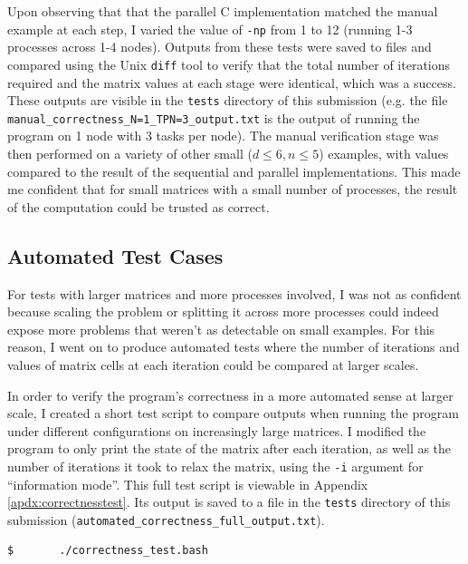 \documentclass[11pt]{article}
\begin{document}
Upon observing that that the parallel C implementation matched the manual example at each step, I varied the value of \texttt{-np} from 1 to 12 (running 1-3 processes across 1-4 nodes). Outputs from these tests were saved to files and compared using the Unix \texttt{diff} tool to verify that the total number of iterations required and the matrix values at each stage were identical, which was a success. These outputs are visible in the \texttt{tests} directory of this submission (e.g. the file \texttt{manual\_correctness\_N=1\_TPN=3\_output.txt} is the output of running the program on 1 node with 3 tasks per node). The manual verification stage was then performed on a variety of other small ($d\leq 6, n\leq 5$) examples, with values compared to the result of the sequential and parallel implementations. This made me confident that for small matrices with a small number of processes, the result of the computation could be trusted as correct. 

{\color{darkindigo}
\subsection*{Automated Test Cases}}
For tests with larger matrices and more processes involved, I was not as confident because scaling the problem or splitting it across more processes could indeed expose more problems that weren't as detectable on small examples. For this reason, I went on to produce automated tests where the number of iterations and values of matrix cells at each iteration could be compared at larger scales. 

In order to verify the program's correctness in a more automated sense at larger scale, I created a short test script to compare outputs when running the program under different configurations on increasingly large matrices. I modified the program to only print the state of the matrix after each iteration, as well as the number of iterations it took to relax the matrix, using the \texttt{-i} argument for ``information mode''. This full test script is viewable in Appendix \ref{apdx:correctnesstest}. Its output is saved to a file in the \texttt{tests} directory of this submission (\texttt{automated\_correctness\_full\_output.txt}). 

\begin{lstlisting}[style=BashInputStyle]
    $		./correctness_test.bash
\end{lstlisting}
\end{document}
